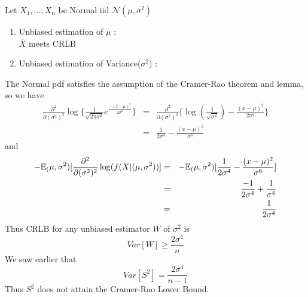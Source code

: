 \documentclass[a4paper,english,12pt]{article}
\begin{document}
\begin{exmp}
Let $X_1,...,X_n$ be Normal iid $\mathcal{N}(\mu,\sigma^{2})$
\begin{enumerate}
\item Unbiased estimation of $\mu$ :\\
$\bar{X}$ meets CRLB
\item Unbiased estimation of Variance($\sigma^{2}$) :\\
\end{enumerate}
The Normal pdf satisfies the assumption of the Cramer-Rao theorem and lemma, so we have
\begin{eqnarray*}
\frac{\partial^2}{\partial(\sigma^2)^{2}}\log\{\frac{1}{\sqrt{2\pi\sigma^{2}}}e^{\frac{-(x-\mu)^{2}}{2\sigma^{2}}}\} &=& \frac{\partial^2}{\partial(\sigma^2)^{2}}\{\log(\frac{1}{\sqrt{\sigma^{2}}})-\frac{(x-\mu)^{2}}{2\sigma^{2}}\} \\ &=&\frac{1}{2\sigma^{4}}-\frac{(x-\mu)^{2}}{\sigma^{6}}
\end{eqnarray*}
and
\begin{eqnarray*}
-\mathbb{E}_(\mu,\sigma^{2})[\frac{\partial^2}{\partial(\sigma^2)^{2}}\log(f(X|(\mu,\sigma^{2}))] &=& -\mathbb{E}_(\mu,\sigma^{2})[\frac{1}{2\sigma^{4}}-\frac{(x-\mu)^{2}}{\sigma^{6}}] \\ &=& \frac{-1}{2\sigma^{4}}+\frac{1}{\sigma^{4}} \\ &=& \frac{1}{2\sigma^{4}}
\end{eqnarray*}
Thus CRLB for any unbiased estimator $W$ of $\sigma^{2}$ is
\begin{equation}
Var[W] \geq \frac{2\sigma^{4}}{n}
\end{equation}
We saw earlier that
\begin{equation*}
Var[S^{2}]=\frac{2\sigma^{4}}{n-1}
\end{equation*}
Thus $S^2$ does not attain the Cramer-Rao Lower Bound.
\end{exmp}
\end{document}
